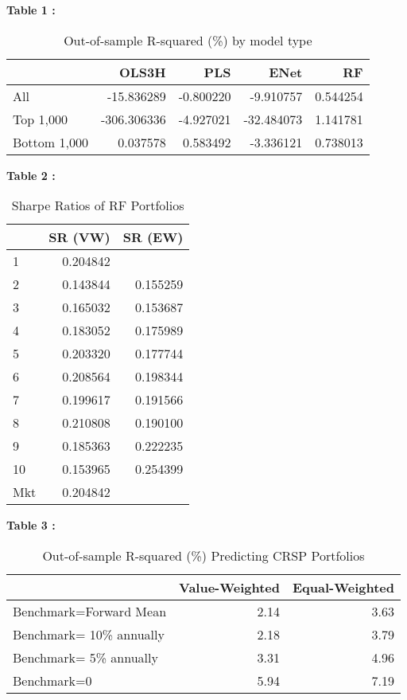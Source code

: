 \documentclass{article}
\begin{document}
\textbf{Table 1 : }\begin{center}
\begin{table}[h]
\centering
\caption{Out-of-sample R-squared (\%) by model type }
\begin{tabular}{lrrrr}
\toprule
{} &       OLS3H &       PLS &       ENet &        RF \\
\midrule
All          &  -15.836289 & -0.800220 &  -9.910757 &  0.544254 \\
Top 1,000    & -306.306336 & -4.927021 & -32.484073 &  1.141781 \\
Bottom 1,000 &    0.037578 &  0.583492 &  -3.336121 &  0.738013 \\
\bottomrule
\end{tabular}
\end{table}
\end{center}
\newpage\textbf{Table 2 : }\begin{center}
\begin{table}[h]
\centering
\caption{Sharpe Ratios of RF Portfolios}
\begin{tabular}{lrr}
\toprule
{} &   SR (VW) &   SR (EW) \\
\midrule
1   &  0.204842 &           \\
2   &  0.143844 &  0.155259 \\
3   &  0.165032 &  0.153687 \\
4   &  0.183052 &  0.175989 \\
5   &  0.203320 &  0.177744 \\
6   &  0.208564 &  0.198344 \\
7   &  0.199617 &  0.191566 \\
8   &  0.210808 &  0.190100 \\
9   &  0.185363 &  0.222235 \\
10  &  0.153965 &  0.254399 \\
\midrule Mkt &  0.204842 &           \\
\bottomrule
\end{tabular}
\end{table}
\end{center}
\newpage\textbf{Table 3 : }\begin{center}
\begin{table}[h]
\centering
\caption{Out-of-sample R-squared (\%) Predicting CRSP Portfolios}
\begin{tabular}{lrr}
\toprule
{} &  Value-Weighted &  Equal-Weighted \\
\midrule
Benchmark=Forward Mean   &            2.14 &            3.63 \\
Benchmark= 10\% annually &            2.18 &            3.79 \\
Benchmark= 5\% annually  &            3.31 &            4.96 \\
Benchmark=0              &            5.94 &            7.19 \\
\bottomrule
\end{tabular}
\end{table}
\end{center}
\end{document}
